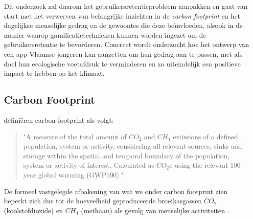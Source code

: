 \documentclass{hogent-article}
\begin{document}
    Dit onderzoek zal daarom het gebruikersretentieprobleem aanpakken en gaat van start met het verwerven van belangrijke inzichten in de \textit{carbon footprint} en het dagelijkse menselijke gedrag en de gewoontes die deze beïnvloeden, alsook in de manier waarop gamificatietechnieken kunnen worden ingezet om de gebruikersretentie te bevorderen. Concreet wordt onderzocht hoe het ontwerp van een app Vlaamse jongeren kan aanzetten om hun gedrag aan te passen, met als doel hun ecologische voetafdruk te verminderen en zo uiteindelijk een positieve impact te hebben op het klimaat.
    
    
    
    \subsection{Carbon Footprint}
    \label{ssec:carbonfootprint}
    
    \textcite{Wright2011} definiëren carbon footprint als volgt:
    
    \begin{quote}
        "A measure of the total amount of $CO_2$ and $CH_4$ emissions of a defined population, system or activity, considering all relevant sources, sinks and storage within the spatial and temporal boundary of the population, system or activity of interest. Calculated as $CO_2$e using the relevant 100-year global warming (GWP100)."
    \end{quote}
    
    De formeel vastgelegde afbakening van wat we onder carbon footprint zien beperkt zich dus tot de hoeveelheid geproduceerde broeikasgassen $CO_2$ (koolstofdioxide) en $CH_4$ (methaan) als gevolg van menselijke activiteiten  \autocite{Wright2011}.
    
\end{document}
